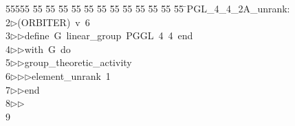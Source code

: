 %
%
\begin{tabbing}
55555 \= 55 \= 55 \= 55 \= 55 \= 55 \= 55 \= 55 \= 55 \= 55 \= 55 \= 55 \= 55 \= \>PGL\_4\_4\_2A\_unrank:\\[0pt]
2\>$\triangleright$\>(ORBITER)\ v\ 6\ \\[0pt]
3\>$\triangleright$\>$\triangleright$\>define\ G\ linear\_group\ PGGL\ 4\ 4\ end\ \\[0pt]
4\>$\triangleright$\>$\triangleright$\>with\ G\ do\ \\[0pt]
5\>$\triangleright$\>$\triangleright$\>group\_theoretic\_activity\ \\[0pt]
6\>$\triangleright$\>$\triangleright$\>$\triangleright$\>element\_unrank\ 1\ \\[0pt]
7\>$\triangleright$\>$\triangleright$\>end\\[0pt]
8\>$\triangleright$\>$\triangleright$\>\\[0pt]
9\>\end{tabbing}
